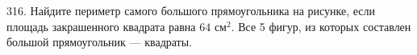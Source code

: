 316. Найдите периметр самого большого прямоугольника на рисунке, если площадь закрашенного квадрата равна $64\text{ см}^2.$ Все 5 фигур, из которых составлен большой прямоугольник --- квадраты.\\
\begin{figure}[ht!]
\end{figure}\\
